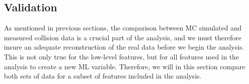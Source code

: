\subsection*{Validation}\label{subsec:Validation}
As mentioned in previous sections, the comparison between \ac{MC} simulated and measured collision data is a crucial part of the analysis, 
and we must therefore insure an adequate reconstruction of the real data before we begin the analysis. This is not only 
true for the low-level features, but for all features used in the analysis to create a new \ac{ML} variable. Therefore, 
we will in this section compare both sets of data for a subset of features included in the analysis.
\begin{figure}[H]
    \renewcommand\figurename{Table}
    \centering
\end{figure}
